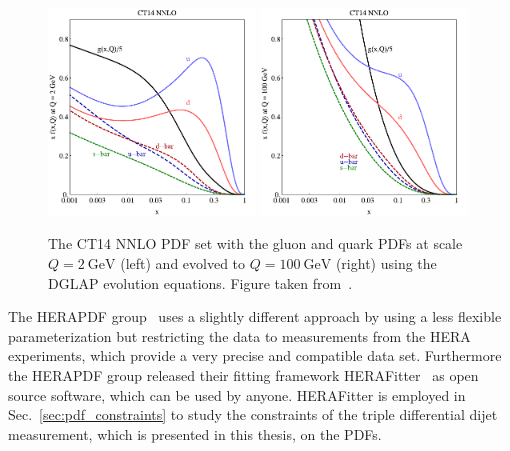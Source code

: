 \begin{figure}[htb] 
    \centering
    \includegraphics[width=0.49\textwidth]{figures/sm_model/ct14_2.pdf}\hfill
    \includegraphics[width=0.49\textwidth]{figures/sm_model/ct14_100.pdf}
    \caption[CT14 NNLO PDF sets]{The CT14 NNLO PDF set with the gluon and quark
        PDFs at scale $Q=\SI{2}{\GeV}$ (left) and evolved to $Q=\SI{100}{\GeV}$
    (right) using the DGLAP evolution equations. Figure taken
    from~\cite{Dulat:2015mca}.}
    \label{fig:ct14_parton_distributions} 
\end{figure}

The HERAPDF group~\cite{Abramowicz:2015mha} uses a slightly different approach
by using a less flexible parameterization but restricting the data to
measurements from the HERA experiments, which provide a very precise and
compatible data set. Furthermore the HERAPDF group released their fitting
framework HERAFitter~\cite{Alekhin:2014irh} as open source software, which can
be used by anyone.  HERAFitter is employed in Sec.~\ref{sec:pdf_constraints} to
study the constraints of the triple differential dijet measurement, which is
presented in this thesis, on the PDFs.

